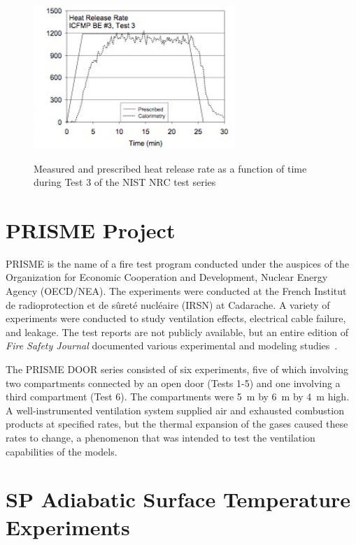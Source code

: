 \begin{figure}[\figoptions{t}]
\begin{center}
\includegraphics[width=3.0in]{FIGURES/NIST_NRC/NISTNRC_HRR}\\
\end{center}
\caption{Measured and prescribed heat release rate as a function of time during Test 3 of the NIST NRC test series}
 \label{fig:NISTNRC_HRR}
\end{figure}


\section{PRISME Project}

PRISME is the name of a fire test program conducted under the auspices of the Organization for Economic Cooperation and Development, Nuclear Energy Agency (OECD/NEA). The experiments were conducted at the French Institut de radioprotection et de s\^{u}ret\'{e} nucl\'{e}aire (IRSN) at Cadarache. A variety of experiments were conducted to study ventilation effects, electrical cable failure, and leakage. The test reports are not publicly available, but an entire edition of {\em Fire Safety Journal} documented various experimental and modeling studies~\cite{Audouin:FSJ}.

The PRISME DOOR series consisted of six experiments, five of which involving two compartments connected by an open door (Tests 1-5) and one involving a third compartment (Test 6). The compartments were 5~m by 6~m by 4~m high. A well-instrumented ventilation system supplied air and exhausted combustion products at specified rates, but the thermal expansion of the gases caused these rates to change, a phenomenon that was intended to test the ventilation capabilities of the models.

\section{SP Adiabatic Surface Temperature Experiments}

